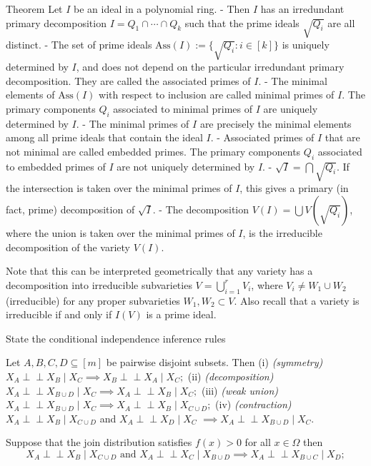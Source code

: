 Theorem
Let \(I\) be an ideal in a polynomial ring.
- Then \(I\) has an irredundant primary decomposition \(I = Q_1 \cap \cdots \cap Q_k\) such that the prime ideals \(\sqrt{Q_i}\) are all distinct.
- The set of prime ideals \(\mathrm{Ass}(I) := \{\sqrt{Q_i} : i \in [k]\}\) is uniquely determined by \(I\), and does not depend on the particular irredundant primary decomposition. They are called the associated primes of \(I\).
- The minimal elements of \(\mathrm{Ass}(I)\) with respect to inclusion are called minimal primes of \(I\). The primary components \(Q_i\) associated to minimal primes of \(I\) are uniquely determined by \(I\).
- The minimal primes of \(I\) are precisely the minimal elements among all prime ideals that contain the ideal \(I\).
- Associated primes of \(I\) that are not minimal are called embedded primes. The primary components \(Q_i\) associated to embedded primes of \(I\) are not uniquely determined by \(I\).
- \(\sqrt{I} = \bigcap \sqrt{Q_i}\). If the intersection is taken over the minimal primes of \(I\), this gives a primary (in fact, prime) decomposition of \(\sqrt{I}\).
- The decomposition \(V(I) = \bigcup V(\sqrt{Q_i})\), where the union is taken over the minimal primes of \(I\), is the irreducible decomposition of the variety \(V(I)\).

Note that this can be interpreted geometrically that any variety has a decomposition into irreducible subvarieties \( V = \bigcup_{i=1}^{r} V_i \),
where \( V_i \neq W_1 \cup W_2 \) (irreducible) for any proper subvarieties \( W_1, W_2 \subset V \). Also recall that a variety is irreducible
if and only if \( I(V) \) is a prime ideal.


State the conditional independence inference rules

Let \(A, B, C, D \subseteq [m]\) be pairwise disjoint subsets. Then
(i) \emph{(symmetry)} \quad \(X_A \perp\!\!\!\perp X_B \mid X_C \implies X_B \perp\!\!\!\perp X_A \mid X_C;\)
(ii) \emph{(decomposition)} \quad \(X_A \perp\!\!\!\perp X_{B \cup D} \mid X_C \implies X_A \perp\!\!\!\perp X_B \mid X_C;\)
(iii) \emph{(weak union)} \quad \(X_A \perp\!\!\!\perp X_{B \cup D} \mid X_C \implies X_A \perp\!\!\!\perp X_B \mid X_{C \cup D};\)
(iv) \emph{(contraction)} \quad \(X_A \perp\!\!\!\perp X_B \mid X_{C \cup D}\) and \(X_A \perp\!\!\!\perp X_D \mid X_C\) \(\implies X_A \perp\!\!\!\perp X_{B \cup D} \mid X_C.\)

Suppose that the join distribution satisfies \( f(x) > 0 \) for all \( x \in \Omega \) then
\[ X_A \perp\!\!\!\perp X_B \mid X_{C \cup D} \text{ and } X_A \perp\!\!\!\perp X_C \mid X_{B \cup D} \implies X_A \perp\!\!\!\perp X_{B \cup C} \mid X_D; \]

